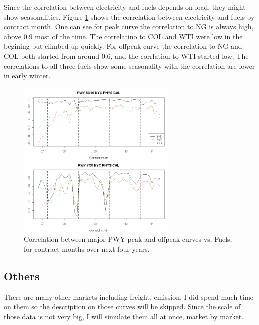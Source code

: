 Since the correlation between electricity and fuels depends on load,
they might show seasonalities. Figure \ref{pwy-fuel-corr} shows 
the correlation between electricity and fuels by contract month.
One can see for peak curve the correlation to NG is always high,
above 0.9 most of the time. The correlatino to COL and WTI were low
in the begining but climbed up quickly. 
For offpeak curve the correlation to NG and COL both started from around
0.6, and the corrlation to WTI started low. The correlations to all
three fuels show some seasonality with the correlation are lower
in early winter. 
\begin{figure}[htbp]
\centering
\includegraphics[width=3in, height=3in]{figures/pwy-fuel-corr.png}
\caption{Correlation between major PWY peak and offpeak curves vs. Fuels, 
for contract months over next four years.}
\label{pwy-fuel-corr}
\end{figure}


\subsection{Others}
There are many other markets including freight, emission. 
I did spend much time on them so the description on those curves
will be skipped. Since the scale of those data is not very big,
I will simulate them all at once, market by market.

